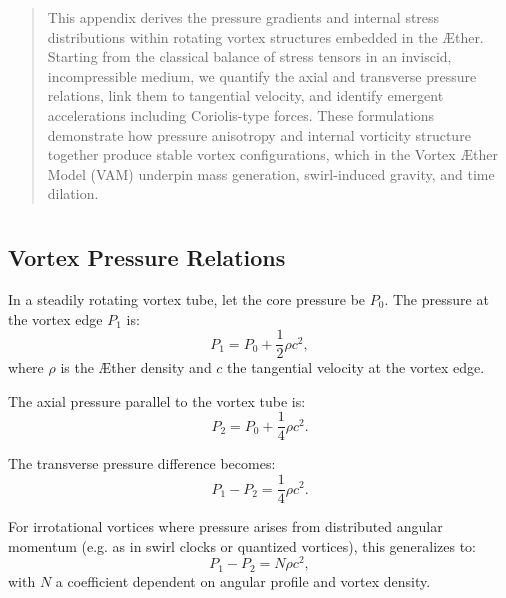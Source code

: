 \documentclass[12pt]{article}
\begin{document}
    \titlepageOpen

    \begin{abstract}
        This appendix derives the pressure gradients and internal stress distributions within rotating vortex structures embedded in the Æther. Starting from the classical balance of stress tensors in an inviscid, incompressible medium, we quantify the axial and transverse pressure relations, link them to tangential velocity, and identify emergent accelerations including Coriolis-type forces. These formulations demonstrate how pressure anisotropy and internal vorticity structure together produce stable vortex configurations, which in the Vortex Æther Model (VAM) underpin mass generation, swirl-induced gravity, and time dilation.
    \end{abstract}


    \titlepageClose
    \fi

    \section{\appendixtitle}


    \subsection*{Vortex Pressure Relations}
    In a steadily rotating vortex tube, let the core pressure be \(P_0\). The pressure at the vortex edge \(P_1\) is:
    \begin{equation}
        P_1 = P_0 + \frac{1}{2} \rho c^2,
    \end{equation}
    where \(\rho\) is the Æther density and \(c\) the tangential velocity at the vortex edge.

    The axial pressure parallel to the vortex tube is:
    \begin{equation}
        P_2 = P_0 + \frac{1}{4} \rho c^2.
    \end{equation}

    The transverse pressure difference becomes:
    \begin{equation}
        P_1 - P_2 = \frac{1}{4} \rho c^2.
    \end{equation}

    For irrotational vortices where pressure arises from distributed angular momentum (e.g. as in swirl clocks or quantized vortices), this generalizes to:
    \begin{equation}
        P_1 - P_2 = N \rho c^2,
    \end{equation}
    with \(N\) a coefficient dependent on angular profile and vortex density.
\end{document}
